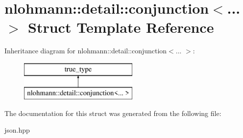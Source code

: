 \hypertarget{structnlohmann_1_1detail_1_1conjunction}{}\section{nlohmann\+:\+:detail\+:\+:conjunction$<$... $>$ Struct Template Reference}
\label{structnlohmann_1_1detail_1_1conjunction}
Inheritance diagram for nlohmann\+:\+:detail\+:\+:conjunction$<$... $>$\+:\begin{figure}[H]
\begin{center}
\leavevmode
\includegraphics[height=2.000000cm]{structnlohmann_1_1detail_1_1conjunction}
\end{center}
\end{figure}


The documentation for this struct was generated from the following file\+:\begin{DoxyCompactItemize}
\item 
json.\+hpp\end{DoxyCompactItemize}
